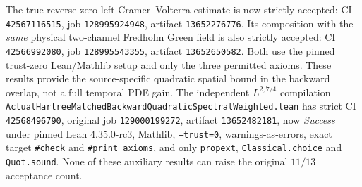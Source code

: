 \documentclass[11pt]{amsart}
\begin{document}
The true reverse zero-left Cramer--Volterra estimate is now
strictly accepted: CI \texttt{42567116515}, job
\texttt{128995924948}, artifact \texttt{13652276776}.
Its composition with the \emph{same} physical two-channel
Fredholm Green field is also strictly accepted: CI
\texttt{42566992080}, job \texttt{128995543355}, artifact
\texttt{13652650582}. Both use the pinned trust-zero
Lean/Mathlib setup and only the three permitted axioms.
These results provide the source-specific quadratic spatial
bound in the backward overlap, not a full temporal PDE gain.
The independent \(L^{2,7/4}\) compilation
\texttt{ActualHartreeMatchedBackwardQuadraticSpectralWeighted.lean}
has strict CI \texttt{42568496790}, original job
\texttt{129000199272}, artifact \texttt{13652482181}, now
\emph{Success} under pinned Lean 4.35.0-rc3, Mathlib,
\texttt{--trust=0}, warnings-as-errors, exact target
\texttt{\#check} and \texttt{\#print axioms}, and only
\texttt{propext}, \texttt{Classical.choice} and \texttt{Quot.sound}. None of these
auxiliary results can raise the original
\(11/13\) acceptance count.
\end{document}
